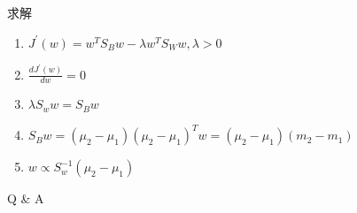 \documentclass[xetex,mathserif,serif]{beamer}
\begin{document}
\begin{frame}{求解}
\begin{enumerate}
  \item ${J^'}\left( w \right) = {w^T}{S_B}w - \lambda {w^T}{S_W}w,\lambda  > 0$
  \item $\frac{{d{J^'}\left( w \right)}}{{dw}} = 0$
  \item $\lambda {S_w}w = {S_B}w$
  \item ${S_B}w = \left( {{\mu _2} - {\mu _1}} \right){\left( {{\mu _2} - {\mu _1}} \right)^T}w = \left( {{\mu _2} - {\mu _1}} \right)\left( {{m_2} - {m_1}} \right)$
  \item $ w \propto S_w^{ - 1}\left( {{\mu _2} - {\mu _1}} \right)$
\end{enumerate}
\end{frame}

\begin{frame}
\begin{center}
  \Large {Q \& A}
\end{center}
\end{frame}
\end{document}
